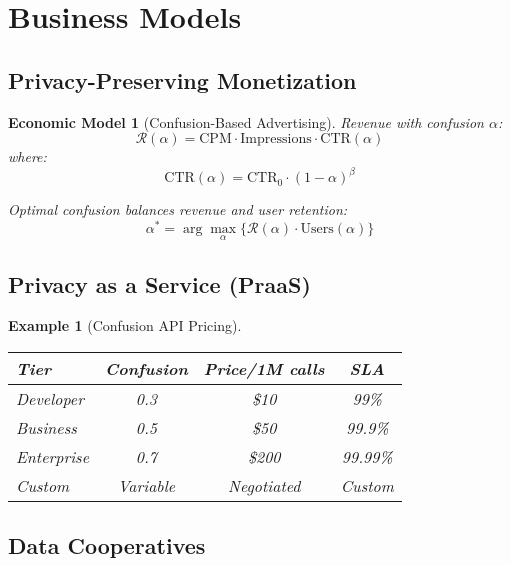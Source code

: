 \documentclass[11pt,final]{article}
\newcommand{\Revenue}{\mathcal{R}}
\newtheorem{example}[theorem]{Example}
\newtheorem{model}[theorem]{Economic Model}
\begin{document}
\section{Business Models}

\subsection{Privacy-Preserving Monetization}

\begin{model}[Confusion-Based Advertising]
Revenue with confusion $\alpha$:
\begin{equation}
\Revenue(\alpha) = \text{CPM} \cdot \text{Impressions} \cdot \text{CTR}(\alpha)
\end{equation}
where:
\begin{equation}
\text{CTR}(\alpha) = \text{CTR}_0 \cdot (1-\alpha)^{\beta}
\end{equation}

Optimal confusion balances revenue and user retention:
\begin{equation}
\alpha^* = \arg\max_\alpha \{\Revenue(\alpha) \cdot \text{Users}(\alpha)\}
\end{equation}
\end{model}

\subsection{Privacy as a Service (PraaS)}

\begin{example}[Confusion API Pricing]
\begin{center}
\begin{tabular}{lccc}
\toprule
\textbf{Tier} & \textbf{Confusion} & \textbf{Price/1M calls} & \textbf{SLA} \\
\midrule
Developer & 0.3 & \$10 & 99\% \\
Business & 0.5 & \$50 & 99.9\% \\
Enterprise & 0.7 & \$200 & 99.99\% \\
Custom & Variable & Negotiated & Custom \\
\bottomrule
\end{tabular}
\end{center}
\end{example}

\subsection{Data Cooperatives}
\end{document}
